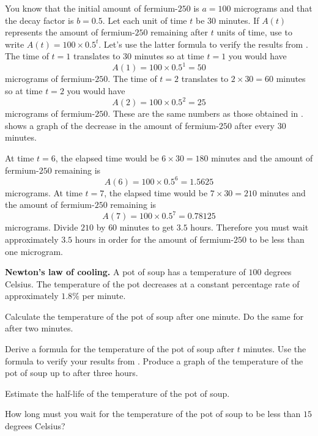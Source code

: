 \documentclass[a4paper,oneside,12pt]{article}
\begin{document}
{\begin{solution}
You know that the initial amount of fermium-$250$ is $a = 100$
micrograms and that the decay factor is $b = 0.5$.  Let each unit of
time $t$ be $30$ minutes.  If $A(t)$ represents the amount of
fermium-$250$ remaining after $t$ units of time, use
 to write $A(t) = 100 \times 0.5^t$.
Let's use the latter formula to verify the results
from .  The time of
$t = 1$ translates to $30$ minutes so at time $t = 1$ you would have
\[
A(1)
=
100 \times 0.5^1
=
50
\]
micrograms of fermium-$250$.  The time of $t = 2$ translates to
$2 \times 30 = 60$ minutes so at time $t = 2$ you would have
\[
A(2)
=
100 \times 0.5^2
=
25
\]
micrograms of fermium-$250$.  These are the same numbers as those
obtained in .
 shows a graph of the decrease in the
amount of fermium-$250$ after every $30$ minutes.

At time $t = 6$, the elapsed time would be $6 \times 30 = 180$ minutes
and the amount of fermium-$250$ remaining is
\[
A(6)
=
100 \times 0.5^6
=
1.5625
\]
micrograms.  At time $t = 7$, the elapsed time would be
$7 \times 30 = 210$ minutes and the amount of fermium-$250$ remaining
is
\[
A(7)
=
100 \times 0.5^7
=
0.78125
\]
micrograms.  Divide $210$ by $60$ minutes to get $3.5$ hours.
Therefore you must wait approximately $3.5$ hours in order for the
amount of fermium-$250$ to be less than one microgram.
\end{solution}
}{}

\begin{exercise}
\textbf{Newton's law of cooling.}
A pot of soup has a temperature of $100$ degrees Celsius.  The
temperature of the pot decreases at a constant percentage rate of
approximately $1.8\%$ per minute.
\begin{packedenum}
\item\label{subex:soup_temperature_1minute_2minutes}
  Calculate the temperature of the pot of soup after one minute.  Do
  the same for after two minutes.

\item\label{subex:soup_temperature_formula_graph}
  Derive a formula for the temperature of the pot of soup after $t$
  minutes.  Use the formula to verify your results
  from .  Produce a
  graph of the temperature of the pot of soup up to after three
  hours.

\item\label{subex:soup_temperature_half_life}
  Estimate the half-life of the temperature of the pot of soup.

\item\label{subex:soup_temperature_15_degrees}
  How long must you wait for the temperature of the pot of soup to be
  less than $15$ degrees Celsius?
\end{packedenum}
\end{exercise}
\end{document}
